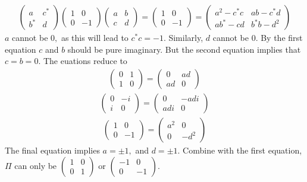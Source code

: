 \begin{align*}
    \begin{pmatrix}
a & c^*\\ b^* & d
\end{pmatrix}
\begin{pmatrix}
1 & 0 \\ 0 & -1
\end{pmatrix}
\begin{pmatrix}
a & b\\ c & d
\end{pmatrix}
=\begin{pmatrix}
1 & 0 \\ 0 & -1
\end{pmatrix}
=\begin{pmatrix}
a^2-c^*c & ab-c^*d \\ ab^*-cd & b^*b-d^2
\end{pmatrix}
\end{align*}
$a$ cannot be $0,$ as this will lead to $c^*c=-1.$ Similarly, $d$ cannot be $0.$
By the first equation $c$ and $b$ should be pure imaginary. But the second equation implies that $c=b=0.$ The euations reduce to 
\begin{align*}
    \begin{pmatrix}
        0 & 1\\1 & 0
    \end{pmatrix}
    =\begin{pmatrix}
        0 & ad\\ad & 0
    \end{pmatrix}
\end{align*}
\begin{align*}
    \begin{pmatrix}
        0 & -i\\i & 0
    \end{pmatrix}
    =\begin{pmatrix}
        0 & -adi\\adi & 0
    \end{pmatrix}
\end{align*}
\begin{align*}
    \begin{pmatrix}
        1 & 0\\0 & -1
    \end{pmatrix}
    =\begin{pmatrix}
        a^2 & 0\\ 0 & -d^2
    \end{pmatrix}
\end{align*}
The final equation implies $a=\pm1,$ and $d=\pm 1.$ Combine with the first equation, $\Pi$ can only be 
$\begin{pmatrix}
    1 & 0\\0 & 1
\end{pmatrix}$
or 
$\begin{pmatrix}
    -1 & 0\\0 & -1
\end{pmatrix}.$

